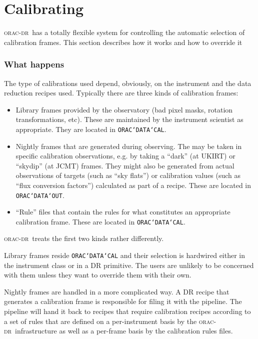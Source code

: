 \documentclass[twoside,11pt]{article}
\newcommand{\xlabel}[1]{}
\renewcommand{\_}{\texttt{\symbol{95}}}
\newcommand{\oracdr}{\textsc{orac-dr}}
\begin{document}
\section{Calibrating\xlabel{calibrating}}

\oracdr\ has a totally flexible system for controlling the automatic
selection of calibration frames. This section describes how it works and
how to override it 

\subsubsection*{What happens}

The type of calibrations used depend, obviously, on the instrument and
the data reduction recipes used. Typically there are three kinds of
calibration frames:

\begin{itemize}

\item
Library frames provided by the observatory (bad pixel masks, rotation
transformations, etc). These are maintained by the instrument
scientist as appropriate. They are located in {\tt ORAC\char`\_DATA\char`\_CAL}.

\item
Nightly frames that are generated during observing. The may be taken
in specific calibration observations, e.g. by taking a ``dark'' (at UKIRT)
or ``skydip'' (at JCMT) frames. They might also be generated from
actual observations of targets (such as ``sky flats'') or
calibration values (such as ``flux conversion factors'') calculated
as part of a recipe. These are located in {\tt ORAC\char`\_DATA\char`\_OUT}.

\item
``Rule'' files that contain the rules for what constitutes an
appropriate calibration frame. These are located in {\tt ORAC\char`\_DATA\char`\_CAL}.

\end{itemize}

\oracdr\ treats the first two kinds rather differently. 

Library frames reside {\tt ORAC\char`\_DATA\char`\_CAL} and their selection is hardwired
either in the instrument class or in a DR primitive. The users are
unlikely to be concerned with them unless they want to override them
with their own.

Nightly frames are handled in a more complicated way. A DR recipe that
generates a calibration frame is responsible for filing it with the
pipeline. The pipeline will hand it back to recipes that require
calibration recipes according to a set of rules that are defined
on a per-instrument basis by the \oracdr\ infrastructure as well
as a per-frame basis by the calibration rules files.
\end{document}
